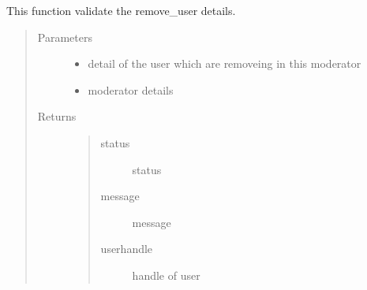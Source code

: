 \documentclass[letterpaper,10pt,english]{sphinxmanual}
\begin{document}

\begin{fulllineitems}
\label{\detokenize{janta:janta.viewhelper.validate_remove_user}}
This function validate the remove\_user details.
\begin{quote}\begin{description}
\item[{Parameters}] \leavevmode\begin{itemize}
\item {} 
 \textendash{} detail of the  user  which are removeing in this moderator

\item {} 
 \textendash{} moderator details

\end{itemize}

\item[{Returns}] \leavevmode
\begin{quote}\begin{description}
\item[{status}] \leavevmode
status

\item[{message}] \leavevmode
message

\item[{userhandle}] \leavevmode
handle of user

\end{description}\end{quote}


\end{description}\end{quote}

\end{fulllineitems}

\end{document}
